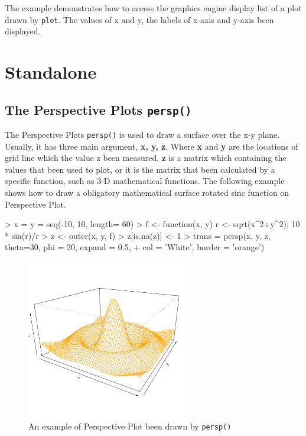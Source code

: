 \documentclass[paper=a4, fontsize=11pt]{report}
\begin{document}
The example demonstrates how to access the graphics engine display list of a plot drawn by \texttt{plot}. The values of x and y, the labels of x-axis and y-axis been displayed.



\chapter{Standalone}
\section{The Perspective Plots \texttt{persp()}}
The Perspective Plots \texttt{persp()} is used to draw a surface over the x-y plane. Usually, it has three main argument, \textbf{x, y, z}. Where \textbf{x} and \textbf{y} are the locations of grid line which the value z been measured, \textbf{z} is a matrix which containing the values that been used to plot, or it is the matrix that been calculated by a specific function, such as 3-D mathematical functions. The following example shows how to draw a obligatory mathematical surface rotated sinc function on Perspective Plot.
\begin{Schunk}
\begin{Sinput}
> x = y = seq(-10, 10, length= 60)
> f <- function(x, y) { r <- sqrt(x^2+y^2); 10 * sin(r)/r }
> z <- outer(x, y, f)
> z[is.na(z)] <- 1
> trans = persp(x, y, z, theta=30, phi = 20, expand = 0.5,
+               col = 'White', border = 'orange')
\end{Sinput}
\end{Schunk}
\begin{figure}[h]
\begin{center}
  \includegraphics[height = 7cm, width = 7cm]{figure/standalone_1.pdf}
  \caption{An example of Perspective Plot been drawn by \texttt{persp()}}
  	\label{figure4}
\end{center}
\end{figure}
\end{document}
